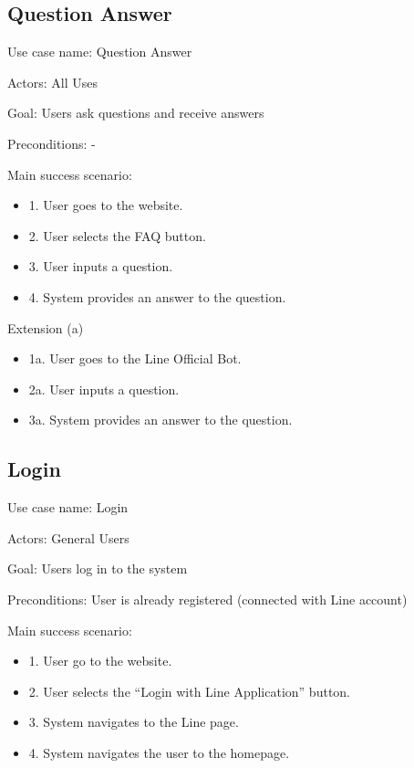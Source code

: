 \documentclass[12pt,oneside,openright,a4paper]{cpe-english-project}
\begin{document}
    \subsection{Question Answer}
      \qquad Use case name: Question Answer \par
      \qquad Actors: All Uses \par
      \qquad Goal: Users ask questions and receive answers \par
      \qquad Preconditions: - \par
      \qquad Main success scenario:
      \begin{itemize}
        \item[] 1. User goes to the website.
        \item[] 2. User selects the FAQ button.
        \item[] 3. User inputs a question.
        \item[] 4. System provides an answer to the question.
      \end{itemize}
      \qquad Extension (a)
      \begin{itemize}
        \item[] 1a. User goes to the Line Official Bot.
        \item[] 2a. User inputs a question.
        \item[] 3a. System provides an answer to the question.
      \end{itemize}

    \subsection{Login}
      \qquad Use case name: Login \par
      \qquad Actors: General Users \par
      \qquad Goal: Users log in to the system \par
      \qquad Preconditions: User is already registered (connected with Line account) \par
      \qquad Main success scenario:
      \begin{itemize}
        \item[] 1. User go to the website.
        \item[] 2. User selects the “Login with Line Application” button.
        \item[] 3. System navigates to the Line page.
        \item[] 4. System navigates the user to the homepage.
      \end{itemize}
\end{document}
